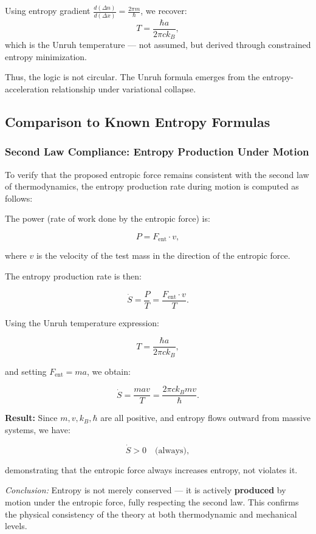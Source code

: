 \documentclass[12pt]{article}
\begin{document}
Using entropy gradient \( \frac{d(\Delta n)}{d(\Delta x)} = \frac{2\pi m}{\hbar} \), we recover:
\[
T = \frac{\hbar a}{2\pi c k_B},
\]
which is the Unruh temperature — not assumed, but derived through constrained entropy minimization.

Thus, the logic is not circular. The Unruh formula emerges from the entropy-acceleration relationship under variational collapse.

\subsection{Comparison to Known Entropy Formulas}

\subsubsection*{Second Law Compliance: Entropy Production Under Motion}

To verify that the proposed entropic force remains consistent with the second law of thermodynamics, the entropy production rate during motion is computed as follows:

The power (rate of work done by the entropic force) is:

\[
P = F_{\text{ent}} \cdot v,
\]

where \( v \) is the velocity of the test mass in the direction of the entropic force.

The entropy production rate is then:

\[
\dot{S} = \frac{P}{T} = \frac{F_{\text{ent}} \cdot v}{T}.
\]

Using the Unruh temperature expression:

\[
T = \frac{\hbar a}{2\pi c k_B},
\]

and setting \( F_{\text{ent}} = m a \), we obtain:

\[
\dot{S} = \frac{m a v}{T} = \frac{2\pi c k_B m v}{\hbar}.
\]

\textbf{Result:} Since \( m, v, k_B, \hbar \) are all positive, and entropy flows outward from massive systems, we have:

\[
\dot{S} > 0 \quad \text{(always)},
\]

demonstrating that the entropic force always increases entropy, not violates it.

\vspace{0.5em}
\textit{Conclusion:} Entropy is not merely conserved — it is actively \textbf{produced} by motion under the entropic force, fully respecting the second law. This confirms the physical consistency of the theory at both thermodynamic and mechanical levels.
\end{document}
